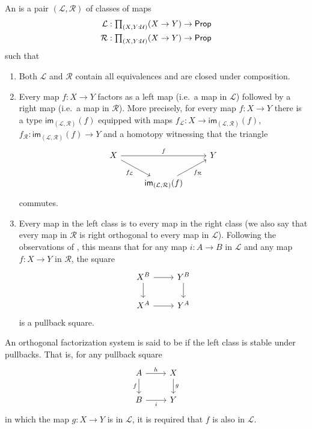 \documentclass[9pt,twosided]{amsart}
\begin{document}
\begin{defn}
  An  is a pair $(\mathcal{L},\mathcal{R})$ of classes of maps
  \begin{align*}
    \mathcal{L} & : \prd{X,Y:\UU} (X \to Y) \to \mathsf{Prop} \\
    \mathcal{R} & : \prd{X,Y:\UU} (X \to Y) \to \mathsf{Prop} 
  \end{align*}
  such that
  \begin{enumerate}
  \item Both $\mathcal{L}$ and $\mathcal{R}$ contain all equivalences and are closed under composition.
  \item Every map $f:X\to Y$ factors as a left map (i.e.~a map in $\mathcal{L}$) followed by a right map (i.e.~a map in $\mathcal{R}$). More precisely, for every map $f:X\to Y$ there is a type $\mathsf{im}_{(\mathcal{L},\mathcal{R})}(f)$ equipped with maps $f_{\mathcal{L}}:X\to \mathsf{im}_{(\mathcal{L},\mathcal{R})}(f)$, $f_{\mathcal{R}}:\mathsf{im}_{(\mathcal{L},\mathcal{R})}(f) \to Y$ and a homotopy witnessing that the triangle
    \begin{equation*}
      \begin{tikzcd}
        X \arrow[rr,"f"] \arrow[dr,swap,"f_{\mathcal{L}}"] & & Y \\
        & \mathsf{im}_{(\mathcal{L},\mathcal{R})}(f) \arrow[ur,swap,"f_{\mathcal{R}}"]
      \end{tikzcd}
    \end{equation*}
    commutes.
  \item Every map in the left class is  to every map in the right class (we also say that every map in $\mathcal{R}$ is right orthogonal to every map in $\mathcal{L}$). Following the observations of \cite{AnelBiedermanFinsterJoyal}, this means that for any map $i:A \to B$ in $\mathcal{L}$ and any map $f:X \to Y$ in $\mathcal{R}$, the square
    \begin{equation*}
      \begin{tikzcd}
        X^B \arrow[r] \arrow[d] & Y^B \arrow[d] \\
        X^A \arrow[r] & Y^A
      \end{tikzcd}
    \end{equation*}
    is a pullback square.
  \end{enumerate}
  An orthogonal factorization system is said to be  if the left class is stable under pullbacks. That is, for any pullback square
  \begin{equation*}
    \begin{tikzcd}
      A \arrow[r,"h"] \arrow[d,swap,"f"] & X \arrow[d,"g"] \\
      B \arrow[r,swap,"i"] & Y
    \end{tikzcd}
  \end{equation*}
  in which the map $g:X \to Y$ is in $\mathcal{L}$, it is required that $f$ is also in $\mathcal{L}$.
\end{defn}
\end{document}
